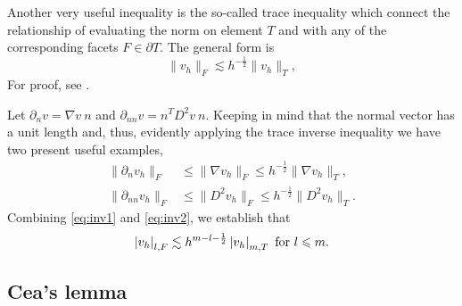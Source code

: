Another very useful inequality is the so-called trace inequality which connect the relationship of evaluating the norm on element $ T $ and with any of the corresponding facets $F \in \partial T$. The general form is
\begin{equation}
    \label{eq:inv2}
\| v_{h} \|_{F   }^{  }  \lesssim
h^{-\frac{1}{2}} \| v_{h} \|_{ T  }^{  },
\end{equation}
For proof, see \cite[Lemma 12.8]{ErnGuermond2021}.

Let $\partial _{n} v = \nabla v \ n$ and $\partial_{nn} v = n^{T} D^2 v \ n $. Keeping in mind that the normal vector has a unit length and, thus, evidently applying the
trace inverse inequality we have two present useful examples,
\begin{equation}
    \label{eq:fund_inv_est}
\begin{split}
    \| \partial _{n} v_{h} \|_{F  }^{  }  & \le \| \nabla v_{h} \|_{F  }^{  }  \le h^{-\frac{1}{2}} \| \nabla  v_{h} \|_{T  }^{  },  \\
    \| \partial _{nn} v_{h} \|_{ F }^{  } & \le  \| D^2 v_{h} \|_{ F }^{  }   \le  h^{-\frac{1}{2}} \| D^2 v_{h} \|_{ T }^{  }.
\end{split}
\end{equation}
Combining \eqref{eq:inv1} and \eqref{eq:inv2}, we establish that
\begin{equation}
    \label{eq:general}
\left\lvert  v_{h}  \right\rvert_{l,F}  \lesssim h^{m-l - \frac{1}{2}} \left\lvert  v_{h}  \right\rvert_{m, T}
\text{ for } l \leqslant m.
\end{equation}

\subsection{Cea's lemma}%
\label{sub:ceas_lemma}


